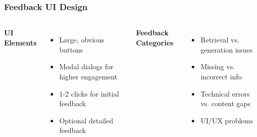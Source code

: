 \begin{frame}
    \frametitle{Feedback UI Design}
    
    \begin{columns}
        \textbf{UI Elements}
        \begin{itemize}
            \item Large, obvious buttons
            \item Modal dialogs for higher engagement
            \item 1-2 clicks for initial feedback
            \item Optional detailed feedback
        \end{itemize}
        
        \textbf{Feedback Categories}
        \begin{itemize}
            \item Retrieval vs. generation issues
            \item Missing vs. incorrect info
            \item Technical errors vs. content gaps
            \item UI/UX problems
        \end{itemize}
    \end{columns}
    
    \begin{center}
    \end{center}
\end{frame}


